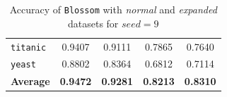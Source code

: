 \documentclass[12pt]{report}
\theoremstyle{definition}
\theoremstyle{definition}
\theoremstyle{definition}
\begin{document}
\begin{table}[ht]
\begin{tabular}{lcccc}
    \multicolumn{1}{l}{\tt titanic}       & \multicolumn{1}{c}{0.9407} & \multicolumn{1}{c}{0.9111} & \multicolumn{1}{c}{0.7865} & \multicolumn{1}{c}{0.7640} \\
    \multicolumn{1}{l}{\tt yeast}         & \multicolumn{1}{c}{0.8802} & \multicolumn{1}{c}{0.8364} & \multicolumn{1}{c}{0.6812} & \multicolumn{1}{c}{0.7114} \\
    \hline
    \multicolumn{1}{l}{\bf Average}       & \multicolumn{1}{c}{\bf 0.9472} & \multicolumn{1}{c}{\bf 0.9281} & \multicolumn{1}{c}{\bf 0.8213} & \multicolumn{1}{c}{\bf 0.8310} \\
    \hline
    \end{tabular}
    \caption{Accuracy of \texttt{Blossom} with \textit{normal} and \textit{expanded} datasets for $seed=9$}
    \label{fig:seed9}
\end{table}
\end{document}
